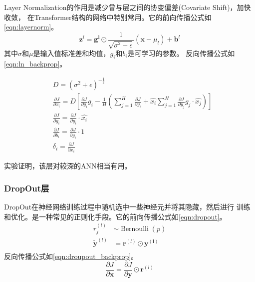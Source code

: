\documentclass[a4paper,twoside,twocolumn]{article}
\begin{document}
\begin{spacing}{1.2}
Layer Normalization\cite{ba2016layer}的作用是减少曾与层之间的协变偏差(Covariate Shift)，加快收敛，
在Transformer结构的网络中特别常用。它的前向传播公式如\eqref{eqn:layernorm}。
\begin{equation}
	\label{eqn:layernorm}
	\boldsymbol{z}^l=\boldsymbol{g^l}\odot\frac{1}{\sqrt{\sigma^2+\epsilon}}\left(\boldsymbol{x}-\mu_l\right)+\boldsymbol{b}^l
\end{equation}
其中$\sigma$和$\mu$是输入值标准差和均值，$g_i$和$b_i$是可学习的参数。
反向传播公式如\eqref{eqn:ln_backprop}。

\begin{equation}
	\label{eqn:ln_backprop}
	\begin{aligned}
		&D= (\sigma^2+\epsilon)^{-\frac{1}{2}}\\
		&\frac{\partial J}{\partial x_i}=D\left[\frac{\partial J}{\partial y_i}g_i-\frac{1}{H}\left(\sum_{j=1}^H\frac{\partial J}{\partial y_i}+\hat{x_i}\sum_{j=1}^H\frac{\partial J}{\partial y_j}g_j\cdot \hat{x_j}\right)\right]\\
		&\frac{\partial J}{\partial g_i}=\frac{\partial J}{\partial y_i}\cdot \hat{x_i} \\
		&\frac{\partial J}{\partial b_i}=\frac{\partial J}{\partial y_i}\cdot 1 \\
		&\delta_i=\frac{\partial J}{\partial x_i}
	\end{aligned}
\end{equation}

实验证明，该层对较深的ANN相当有用。

\subsubsection{DropOut层}

DropOut\cite{srivastava2014dropout}在神经网络训练过程中随机选中一些神经元并将其隐藏，然后进行
训练和优化。是一种常见的正则化手段。它的前向传播公式如\eqref{eqn:dropout}。
\begin{equation}
	\label{eqn:dropout}
	\begin{aligned}
		r_j^{(l)} &\sim \mathop{Bernoulli}(p) \\
		\widetilde{\boldsymbol{y}}^{(l)}&=\boldsymbol{r}^{(l)}\odot\boldsymbol{y^{(l)}} \\
	\end{aligned}
\end{equation}
反向传播公式如\eqref{eqn:droupout_backprop}。
\begin{equation}
	\label{eqn:droupout_backprop}
	\frac{\partial J}{\partial \boldsymbol{x}}=\frac{\partial J}{\partial \boldsymbol{y}}\odot \boldsymbol{r}^{(l)}
\end{equation}


\end{spacing}
\end{document}
